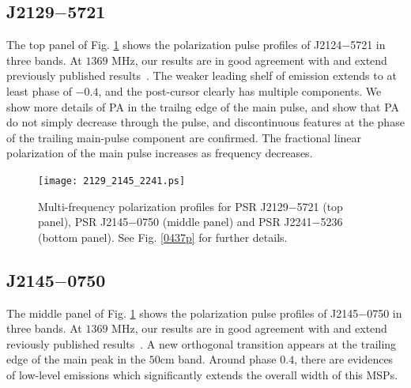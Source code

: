 \documentclass[useAMS,usenatbib]{mn2e}
\begin{document}

\subsection{J2129$-$5721}

The top panel of Fig. \ref{2129p} shows the polarization pulse profiles of 
J2124$-$5721 
in three bands.
%
At $1369$ MHz, our results are in good agreement with and extend previously 
published results~\citep{Yan11}.
%
The weaker leading shelf of emission extends to at least phase of $-0.4$, and 
the post-cursor clearly has multiple components.
%
We show more details of PA in the trailng edge of the main pulse, and show that 
PA do not simply decrease through the pulse, and discontinuous features at the 
phase of the trailing main-pulse component are confirmed.
%
The fractional linear polarization of the main pulse increases as frequency 
decreases.


\begin{figure}
\begin{center}
\texttt{[image: 2129\_2145\_2241.ps]}
\caption{Multi-frequency polarization profiles for PSR J2129$-$5721 (top 
panel), PSR J2145$-$0750 (middle panel) and PSR J2241$-$5236 (bottom panel). 
See Fig. \ref{0437p} for further details.}
\label{2129p}
\end{center}
\end{figure}

\subsection{J2145$-$0750}

The middle panel of Fig. \ref{2129p} shows the polarization pulse profiles of 
J2145$-$0750 
in three bands.
%
At $1369$ MHz, our results are in good agreement with and extend reviously 
published results~\citep{Yan11}.
%
A new orthogonal transition appears at the trailing edge of the main peak in 
the $50$cm band.
%
Around phase $0.4$, there are evidences of low-level emissions which 
significantly extends the overall width of this MSPs.
%
\end{document}

